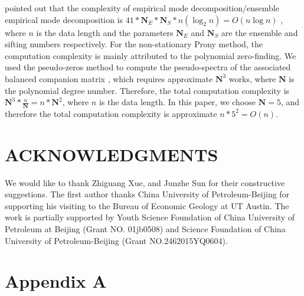 \citet[]{eemd_comp} pointed out that the complexity of empirical mode decomposition/ensemble
empirical mode decomposition is $41*\mathbf{N}_E*\mathbf{N}_S*n(\log_2n)=O(n\log n)$
, where $n$ is the data length and the parameters $\mathbf{N}_E$ and $\mathbf{N}_S$ are the
ensemble and sifting numbers respectively. For the non-stationary Prony method, the computation
complexity is mainly attributed to the polynomial zero-finding. We used the pseudo-zeros 
method to compute the pseudo-spectra of the associated balanced 
companion matrix \cite[]{roots}, which requires approximate $\mathbf{N}^3$ works, where $\mathbf{N}$
is the polynomial degree number. Therefore, the total computation complexity is 
$\mathbf{N}^3*\frac{n}{\mathbf{N}}=n*\mathbf{N}^2$, where $n$ is the data length.
In this paper, we choose $\mathbf{N}=5$, and therefore the total computation complexity is approximate 
$n*5^2 = O(n)$.
\section{ACKNOWLEDGMENTS}
We would like to thank Zhiguang Xue, and Junzhe Sun for their constructive 
suggestions. The first author thanks China University of Petroleum-Beijing 
for supporting his visiting to the Bureau of Economic Geology at UT Austin. 
The work is partially supported by Youth Science Foundation of China 
University of Petroleum at Beijing (Grant NO. 01jb0508) and Science Foundation 
of China University of Petroleum-Beijing (Grant NO.2462015YQ0604).

\newpage
\appendix
\section{Appendix A}

